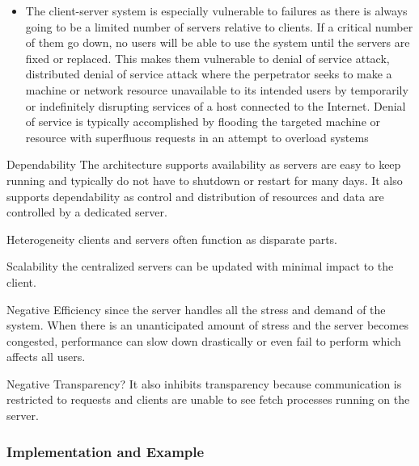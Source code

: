 {\begin{itemize}
        \item The client-server system is especially vulnerable to failures as
            there is always going to be a limited number of servers relative to
            clients. If a critical number of them go down, no users will be
            able to use the system until the servers are fixed or replaced.
            This makes them vulnerable to denial of service attack, distributed
            denial of service attack where the perpetrator seeks to make a
            machine or network resource unavailable to its intended users by
            temporarily or indefinitely disrupting services of a host connected
            to the Internet. Denial of service is typically accomplished by
            flooding the targeted machine or resource with superfluous requests
            in an attempt to overload systems
\end{itemize}}

\begin{nfps}
\item[Dependability] The architecture supports availability as servers are easy
    to keep running and typically do not have to shutdown or restart for many
    days. It also supports dependability as control and distribution of
    resources and data are controlled by a dedicated server. 
\item[Heterogeneity] clients and servers often function as disparate parts. 
\item[Scalability] the centralized servers can be updated with minimal impact
    to the client.

\item[Negative Efficiency] since the server handles all the stress and demand
    of the system. When there is an unanticipated amount of stress and the
    server becomes congested, performance can slow down drastically or even
    fail to perform which affects all users. 
\item[Negative Transparency?] It also inhibits transparency because
    communication is restricted to requests and clients are unable to see fetch
    processes running on the server.
\end{nfps}

\subsubsection{Implementation and Example}


